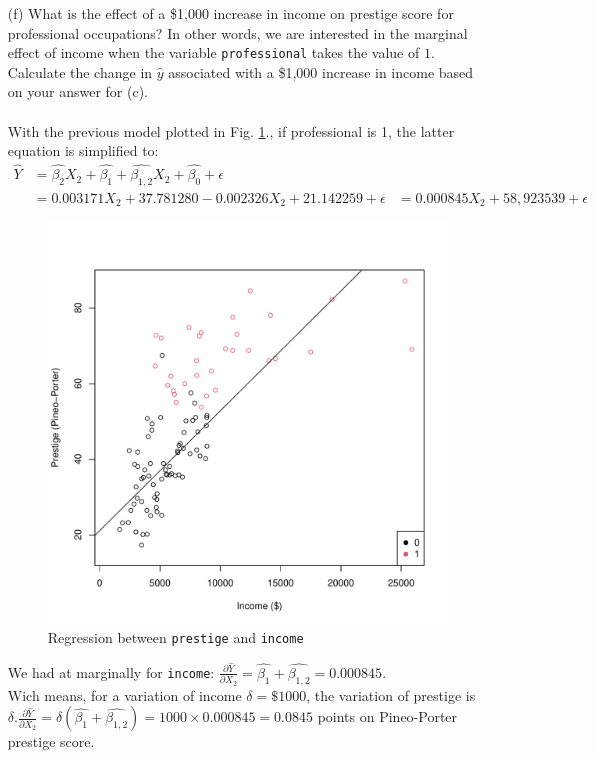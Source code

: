 \documentclass[12pt,letterpaper]{article}
\begin{document}
\begin{enumerate}
	\item [(f)]
	What is the effect of a \$1,000 increase in income on prestige score for professional occupations? In other words, we are interested in the marginal effect of income when the variable \texttt{professional} takes the value of $1$. Calculate the change in $\hat{y}$ associated with a \$1,000 increase in income based on your answer for (c).\\
	\\
		
	With the previous model plotted in Fig. \ref{fig:lm_1}., if professional is 1, the latter equation is simplified to:
	\begin{align*}
				 \hat{Y} &= \hat{\beta_2} X_2 + \hat{\beta_1} + \hat{\beta_{1,2}} X_2 + \hat{\beta_0} + \epsilon \\
				&=     0.003171   X_2 +  37.781280  - 0.002326 X_2 +  21.142259       + \epsilon
				&=   0.000845X_2 + 58,923539  +\epsilon
	\end{align*}

	\begin{figure}[h!]\centering
				\caption{\footnotesize Regression between \texttt{prestige} and  \texttt{income}}
				\label{fig:lm_1}
				\includegraphics[width=.85\textwidth]{lm1.pdf}
	\end{figure}	
	We had at marginally for \texttt{income}:
	 $\frac{\partial \hat{Y}}{\partial X_2}= \hat{\beta_1} + \hat{\beta_{1,2}} = 0.000845$. \\
	Wich means, for a variation of income $\delta = \$1000$, the variation of prestige is\\
	 $\delta. \frac{\partial \hat{Y}}{\partial X_2}= \delta (\hat{\beta_1}+ \hat{\beta_{1,2}}) = 1000 \times 0.000845 = 0.0845$ points on Pineo-Porter prestige score. \\
	\\
	

\end{enumerate}
\end{document}
